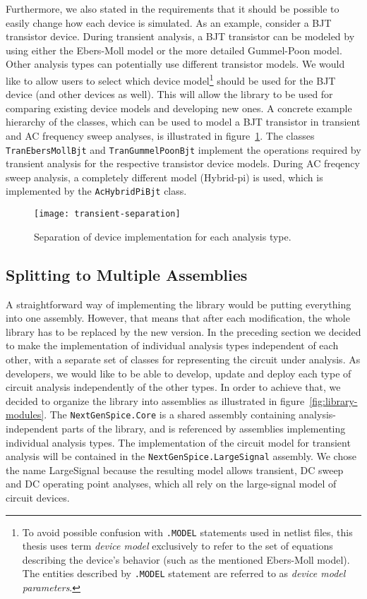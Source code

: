 Furthermore, we also stated in the requirements that it should be possible to easily change how each device is simulated. As an example, consider a BJT transistor device. During transient analysis, a BJT transistor can be modeled by using either the Ebers-Moll model or the more detailed Gummel-Poon model. Other analysis types can potentially use different transistor models. We would like to allow users to select which device model\footnote{To avoid possible confusion with \texttt{.MODEL} statements used in netlist files, this thesis uses term \textit{device model} exclusively to refer to the set of equations describing the device's behavior (such as the mentioned Ebers-Moll model). The entities described by \texttt{.MODEL} statement are referred to as \textit{device model parameters}.} should be used for the BJT device (and other devices as well). This will allow the library to be used for comparing existing device models and developing new ones. A concrete example hierarchy of the classes, which can be used to model a BJT transistor in transient and AC frequency sweep analyses, is illustrated in figure~\ref{fig:analysis-separation}. The classes \texttt{TranEbersMollBjt} and \texttt{TranGummelPoonBjt} implement the operations required by transient analysis for the respective transistor device models. During AC freqency sweep analysis, a completely different model (Hybrid-pi) is used, which is implemented by the \texttt{AcHybridPiBjt} class.

\begin{figure}[h]
	\centering
	\texttt{[image: transient-separation]}
	\caption{Separation of device implementation for each analysis type.}
	\label{fig:analysis-separation}
\end{figure}


\subsection{Splitting to Multiple Assemblies}
\label{chap:analysis:splitting}

A straightforward way of implementing the library would be putting everything into one assembly. However, that means that after each modification, the whole library has to be replaced by the new version. In the preceding section we decided to make the implementation of individual analysis types independent of each other, with a separate set of classes for representing the circuit under analysis. As developers, we would like to be able to develop, update and deploy each type of circuit analysis independently of the other types. In order to achieve that, we decided to organize the library into assemblies as illustrated in figure~\ref{fig:library-modules}. The \texttt{NextGenSpice.Core} is a shared assembly containing analysis-independent parts of the library, and is referenced by assemblies implementing individual analysis types. The implementation of the circuit model for transient analysis will be contained in the \texttt{NextGenSpice.LargeSignal} assembly. We chose the name LargeSignal because the resulting model allows transient, DC sweep and DC operating point analyses, which all rely on the large-signal model of circuit devices.

